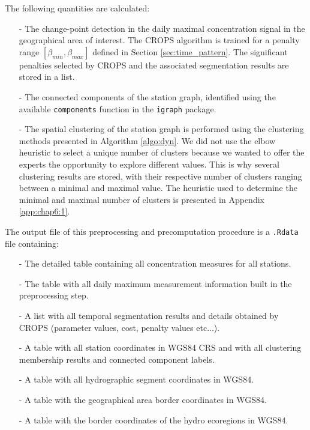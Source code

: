 The following quantities are calculated:
\begin{itemize}
\item[-] The change-point detection in the daily maximal concentration signal in the geographical area of interest. The CROPS algorithm is trained for a penalty range $[\beta_{min},\beta_{max}]$ defined in Section \ref{sec:time_pattern}. The significant penalties selected by CROPS and the associated segmentation results are stored in a list.
\item[-] The connected components of the station graph, identified using the available \texttt{components} function in the \texttt{igraph} package.
\item[-] The spatial clustering of the station graph is performed using the clustering methods presented in Algorithm \ref{algo:dyn}. We did not use the elbow heuristic to select a unique number of clusters because we wanted to offer the experts the opportunity to explore different values. This is why several clustering results are stored, with their respective number of clusters ranging between a minimal and maximal value. The heuristic used to determine the minimal and maximal number of clusters is presented in Appendix \ref{app:chap6:1}.  
\end{itemize}

The output file of this preprocessing and precomputation procedure is a \texttt{.Rdata} file containing: 
\begin{itemize}
\item[-] The detailed table containing all concentration measures for all stations.
\item[-] The table with all daily maximum measurement information built in the preprocessing step.
\item[-] A list with all temporal segmentation results and details obtained by CROPS (parameter values, cost, penalty values etc...).
\item[-] A table with all station coordinates in WGS84 CRS and with all clustering membership results and connected component labels. 
\item[-] A table with all hydrographic segment coordinates in WGS84. 
\item[-] A table with the geographical area border coordinates in WGS84.
\item[-] A table with the border coordinates of the hydro ecoregions in WGS84.
\end{itemize}



